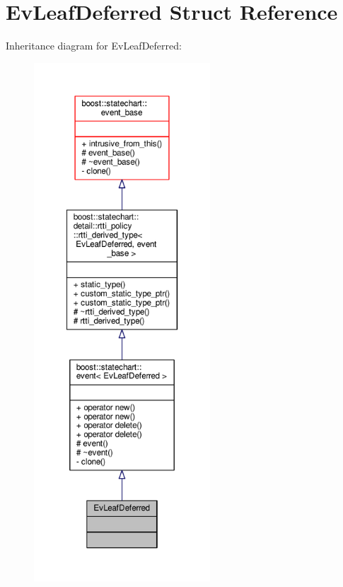 \hypertarget{struct_ev_leaf_deferred}{}\section{Ev\+Leaf\+Deferred Struct Reference}
\label{struct_ev_leaf_deferred}


Inheritance diagram for Ev\+Leaf\+Deferred\+:
\nopagebreak
\begin{figure}[H]
\begin{center}
\leavevmode
\includegraphics[height=550pt]{struct_ev_leaf_deferred__inherit__graph}
\end{center}
\end{figure}



